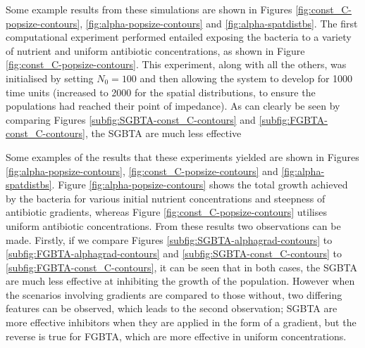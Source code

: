 \documentclass[a4paper,12pt]{article}
\begin{document}
Some example results from these simulations are shown in Figures \ref{fig:const_C-popsize-contours}, \ref{fig:alpha-popsize-contours} and \ref{fig:alpha-spatdistbs}.  The first 
computational experiment performed entailed exposing the bacteria to a variety of nutrient and uniform antibiotic concentrations, as shown in Figure \ref{fig:const_C-popsize-contours}.  
This experiment, along with all the others, was initialised by setting $N_0 = 100$ and then allowing the system to develop for 1000 time units (increased to 2000 for the spatial 
distributions, to ensure the populations had reached their point of impedance).  As can clearly be seen by comparing Figures \ref{subfig:SGBTA-const_C-contours} and 
\ref{subfig:FGBTA-const_C-contours}, the SGBTA are much less effective 


Some examples of the results that these experiments yielded are shown in Figures \ref{fig:alpha-popsize-contours}, \ref{fig:const_C-popsize-contours} and \ref{fig:alpha-spatdistbs}.  
Figure \ref{fig:alpha-popsize-contours} shows the total growth achieved by the bacteria for various initial nutrient concentrations and steepness of antibiotic gradients, whereas 
Figure \ref{fig:const_C-popsize-contours} utilises uniform antibiotic concentrations.  From these results two observations can be made.  Firstly, if we compare Figures 
\ref{subfig:SGBTA-alphagrad-contours} to \ref{subfig:FGBTA-alphagrad-contours} and \ref{subfig:SGBTA-const_C-contours} to \ref{subfig:FGBTA-const_C-contours}, it can be seen that 
in both cases, the SGBTA are much less effective at inhibiting the growth of the population.  However when the scenarios involving gradients are compared to those without, two 
differing features can be observed, which leads to the second observation; SGBTA are more effective inhibitors when they are applied in the form of a gradient, but the reverse is true 
for FGBTA, which are more effective in uniform concentrations.
\end{document}
